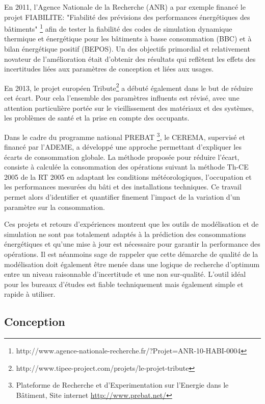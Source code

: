 En 2011, l'Agence Nationale de la Recherche (ANR) a par exemple financé le projet FIABILITE: "Fiabilité des prévisions des performances énergétiques des bâtiments" \footnote{http://www.agence-nationale-recherche.fr/?Projet=ANR-10-HABI-0004} afin de tester la fiabilité des codes de simulation dynamique thermique et énergétique pour les bâtiments à basse consommation (BBC) et à bilan énergétique positif (BEPOS). Un des objectifs primordial et relativement novateur de l'amélioration était d'obtenir des résultats qui reflètent les effets des incertitudes liées aux paramètres de conception et liées aux usages.

En 2013, le projet européen Tribute\footnote{http://www.tipee-project.com/projets/le-projet-tribute} a débuté également dans le but de réduire cet écart. Pour cela l'ensemble des paramètres influents est révisé, avec une attention particulière portée sur le vieillissement des matériaux et des systèmes, les problèmes de santé et la prise en compte des occupants. 

Dans le cadre du programme national PREBAT \footnote{Plateforme de Recherche et d'Experimentation sur l'Energie dans le Bâtiment, Site internet \url{http://www.prebat.net/}}, le CEREMA, supervisé et financé par l'ADEME, a développé une approche permettant d'expliquer les écarts de consommation globale. La méthode proposée pour réduire l'écart, consiste à calculée la consommation des opérations suivant la méthode Th-CE 2005 de la RT 2005 en adaptant les conditions météorologiques, l'occupation et les performances mesurées du bâti et des installations techniques. Ce travail permet alors d'identifier et quantifier finement l'impact de la variation d'un paramètre sur la consommation.

Ces projets et retours d'expériences montrent que les outils de modélisation et de simulation ne sont pas totalement adaptés à la prédiction des consommations énergétiques et qu'une mise à jour est nécessaire pour garantir la performance des opérations. Il est néanmoins sage de rappeler que cette démarche de qualité de la modélisation doit également être menée dans une logique de recherche d'optimum entre un niveau raisonnable d'incertitude et une non sur-qualité. L'outil idéal pour les bureaux d'études est fiable techniquement mais également simple et rapide à utiliser.

\subsection{Conception}

